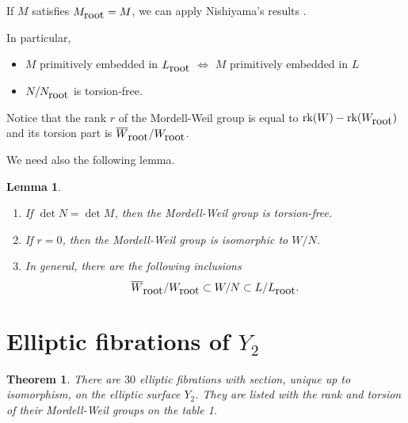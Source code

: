 \documentclass{amsart}
\newtheorem{theo}{Theorem}
\newtheorem{lem}{Lemma}
\begin{document}
If $M$ satisfies $M_{\hbox{root}}=M$, we can apply Nishiyama's results \cite{Nis}.

In particular,
\begin{itemize}
\item $M$ primitively embedded in $L_{\hbox{root}}$ $\Longleftrightarrow $ $M$ primitively embedded in $L$
\item $N/N_{\hbox{root}}$ is torsion-free.
\end{itemize}

Notice that the rank $r$ of the Mordell-Weil group is equal to $\hbox{rk} (W)- \hbox{rk} (W_{\hbox{root}})$ and its torsion part is $\overline{W}_{\hbox{root}}/W_{\hbox{root}}$.





                              
We need also the following lemma.
\begin{lem}
\begin{enumerate}
\item If $\det N=\det M$, then the Mordell-Weil group is torsion-free.
\item If $r=0$, then the Mordell-Weil group is isomorphic to $W/N$.
\item In general, there are the following inclusions
$$ \overline{W}_{\hbox{root}}/W_{\hbox{root}} \subset W/N \subset L/L_{\hbox{root}}.$$
\end{enumerate}
\end{lem}
\section{Elliptic fibrations of $Y_2$}
\begin{theo}
There are $30$ elliptic fibrations with section, unique up to isomorphism, on the elliptic surface $Y_2$. They are listed with the rank and torsion of their Mordell-Weil groups on the table 1.
\end{theo}
\end{document}
